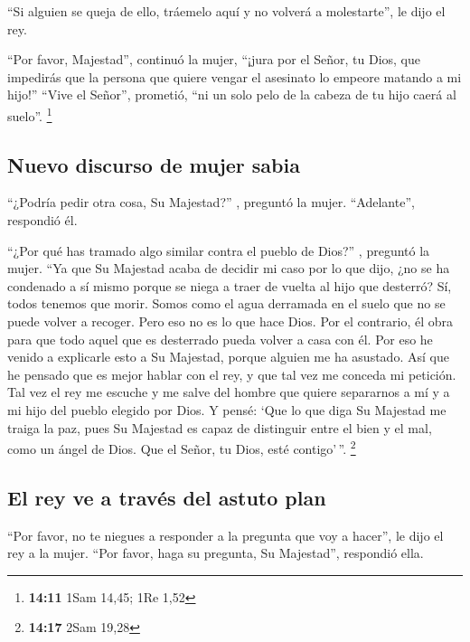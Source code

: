  ``Si alguien se queja de ello, tráemelo aquí y no
volverá a molestarte'', le dijo el rey.

 ``Por favor, Majestad'', continuó la mujer, ``¡jura por
el Señor, tu Dios, que impedirás que la persona que quiere vengar el
asesinato lo empeore matando a mi hijo!'' ``Vive el Señor'', prometió,
``ni un solo pelo de la cabeza de tu hijo caerá al suelo''. \footnote{\textbf{14:11}
  1Sam 14,45; 1Re 1,52}

\hypertarget{nuevo-discurso-de-mujer-sabia}{%
\subsection{Nuevo discurso de mujer
sabia}\label{nuevo-discurso-de-mujer-sabia}}

 ``¿Podría pedir otra cosa, Su Majestad?'' , preguntó la
mujer. ``Adelante'', respondió él.

 ``¿Por qué has tramado algo similar contra el pueblo de
Dios?'' , preguntó la mujer. ``Ya que Su Majestad acaba de decidir mi
caso por lo que dijo, ¿no se ha condenado a sí mismo porque se niega a
traer de vuelta al hijo que desterró?  Sí, todos tenemos
que morir. Somos como el agua derramada en el suelo que no se puede
volver a recoger. Pero eso no es lo que hace Dios. Por el contrario, él
obra para que todo aquel que es desterrado pueda volver a casa con él.
 Por eso he venido a explicarle esto a Su Majestad,
porque alguien me ha asustado. Así que he pensado que es mejor hablar
con el rey, y que tal vez me conceda mi petición.  Tal
vez el rey me escuche y me salve del hombre que quiere separarnos a mí y
a mi hijo del pueblo elegido por Dios.  Y pensé: `Que lo
que diga Su Majestad me traiga la paz, pues Su Majestad es capaz de
distinguir entre el bien y el mal, como un ángel de Dios. Que el Señor,
tu Dios, esté contigo'\,''. \footnote{\textbf{14:17} 2Sam 19,28}

\hypertarget{el-rey-ve-a-travuxe9s-del-astuto-plan}{%
\subsection{El rey ve a través del astuto
plan}\label{el-rey-ve-a-travuxe9s-del-astuto-plan}}

 ``Por favor, no te niegues a responder a la pregunta que
voy a hacer'', le dijo el rey a la mujer. ``Por favor, haga su pregunta,
Su Majestad'', respondió ella.

